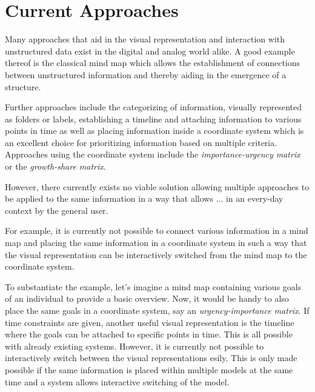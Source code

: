 \section{Current Approaches}

Many approaches that aid in the visual representation and interaction with
unstructured data exist in the digital and analog world alike. A good example
thereof is the classical mind map which allows the establishment of connections
between unstructured information and thereby aiding in the emergence of a
structure.

Further approaches include the categorizing of information, visually
represented as folders or labels, establishing a timeline and attaching
information to various points in time as well as placing information inside a
coordinate system which is an excellent choice for prioritizing information
based on multiple criteria. Approaches using the coordinate system include
the \textit{importance-urgency matrix} or the \textit{growth-share matrix}.

However, there currently exists no viable solution allowing multiple approaches
to be applied to the same information in a way that allows ... in an every-day
context by the general user.

For example, it is currently not possible to connect various information in a
mind map and placing the same information in a coordinate system in such a way
that the visual representation can be interactively switched from the mind map
to the coordinate system.

To substantiate the example, let's imagine a mind map containing various goals
of an individual to provide a basic overview. Now, it would be handy to also
place the same goals in a coordinate system, say an \textit{urgency-importance
matrix}. If time constraints are given, another useful visual representation is
the timeline where the goals can be attached to specific points in time. This
is all possible with already existing systems. However, it is currently not
possible to interactively switch between the visual representations esily. This
is only made possible if the same information is placed within multiple models
at the same time and a system allows interactive switching of the model.
